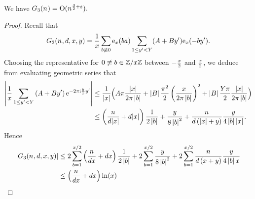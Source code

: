   \begin{lemma}\label{lemma.g-three}
    We have
    \(
      \TheQuantityOf[3]{\Size}
      =
      \BigO{\Size^{\frac32 + \TheEpsilon}}
      .
    \)
  \end{lemma}
  \begin{proof}
    Recall that
    \[
      \TheQuantityOf[3]{\Size,\TheDivisor,\LeftA,\RightA}
      =
      \frac{1}{\LeftA}
      \Sum[\ModRingElement\not\congruent 0]{
        \TheCharOf{\ModRingElement\TheCongruenceClass}
        \Sum[1\leq\RightB<\UpperBound]{
          (\ConstantTerm+\LinearTerm\RightB)\TheCharOf{-\ModRingElement\RightB}. 
        }
      }      
    \]
    Choosing the representative for $0 \not\equiv b\in\mathbb{Z}/x\mathbb{Z}$
    between $-\frac{x}{2}$ and $\frac{x}{2}$,
    we deduce from %
    evaluating geometric series that
    \begin{align*}
      \AbsValueOf{
      \frac{1}{\LeftA}
      \Sum[1\leq\RightB<\UpperBound]{
      \Parens{\ConstantTerm+\LinearTerm\RightB}
      \ExpOf{-2\pi\ImUnit\frac{\ModRingElement}{\LeftA}\RightB}
      }
      }
      &\leq
        \frac{1}{|\LeftA|}\Big(
        \ConstantTerm\pi\frac{|\LeftA|}{2\pi\AbsRingElement}
        +
        \AbsValueOf{\LinearTerm}
        \frac{\pi^2}{2}\Parens{
        \frac{\LeftA}{2\pi\AbsRingElement}
        }^2
        +       \AbsValueOf{\LinearTerm}
        \frac{\UpperBound\pi}{2}\frac{|\LeftA|}{2\pi\AbsRingElement} \Big)\\
      &\leq
      \Parens{
        \frac{\Size}{\TheDivisor|\LeftA|} +\TheDivisor|\LeftA|
      }\frac{1}{2\AbsRingElement}
      +
      \frac{\RightA}{8\AbsRingElement^2}
      +
        \frac{\Size}{\TheDivisor\Parens{|\LeftA|+\RightA}}\frac{\RightA}{4\AbsRingElement|\LeftA|}
        .
    \end{align*}
    Hence
    \begin{align*}
      \AbsValueOf{\TheQuantityOf[3]{\Size,\TheDivisor,\LeftA,\RightA}}
      &\leq
      2
      \sum_{\ModRingElement=1}^{\LeftA/2}
      \Parens{
        \frac{\Size}{\TheDivisor\LeftA} +\TheDivisor\LeftA
      }\frac{1}{2\AbsRingElement}
      +
      2
      \sum_{\ModRingElement=1}^{\LeftA/2}
      \frac{\RightA}{8\AbsRingElement^2}
      +
      2
      \sum_{\ModRingElement=1}^{\LeftA/2}
      \frac{\Size}{\TheDivisor\Parens{\LeftA+\RightA}}\frac{\RightA}{4\AbsRingElement\LeftA}
      \\
      &\leq
      \Parens{
        \frac{\Size}{\TheDivisor\LeftA} +\TheDivisor\LeftA
      }\LogOf{\LeftA}

\end{align*}
\end{proof}
